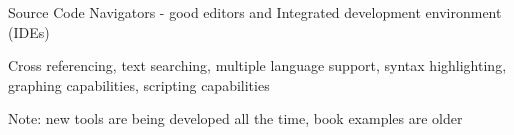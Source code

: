 \documentclass[Screen16to9,17pt]{foils}
\begin{document}

\begin{list2}
\item Source Code Navigators - good editors and Integrated development environment (IDEs)
\item Cross referencing, text searching, multiple language support, syntax highlighting, graphing capabilities, scripting capabilities
\item Note: new tools are being developed all the time, book examples are older
\end{list2}



\slidenext{}
\end{document}
